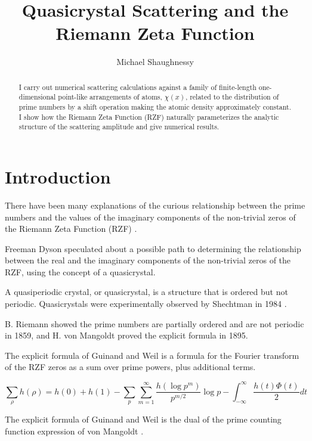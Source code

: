 \documentclass[11pt, oneside]{article}
\title{Quasicrystal Scattering and the Riemann Zeta Function}
\author{Michael Shaughnessy}
\begin{document}
\maketitle

\begin{abstract}
I carry out numerical scattering calculations against a family of finite-length one-dimensional point-like arrangements of atoms, $\chi(x)$, related to the distribution of prime numbers by a shift operation making the atomic density approximately constant. 
I show how the Riemann Zeta Function (RZF) naturally parameterizes the analytic structure of the scattering amplitude and give numerical results.
\end{abstract}

\section{Introduction}

There have been many explanations of the curious relationship between the prime numbers and the values of the imaginary components of the non-trivial zeros of the Riemann Zeta Function (RZF) \cite{Riemann1859, Selberg1956, Dyson2009, Zhang2014}.

Freeman Dyson \cite{Baez2013} speculated about a possible path to determining the relationship between the real and the imaginary components of the non-trivial zeros of the RZF, using the concept of a quasicrystal.

A quasiperiodic crystal, or quasicrystal, is a structure that is ordered but not periodic. Quasicrystals were experimentally observed by Shechtman in 1984 \cite{Shectman1984}. 

B. Riemann showed the prime numbers are partially ordered and are not periodic \cite{Riemann1859} in 1859, and H. von Mangoldt \cite{VonMangoldt1895} proved the explicit formula in 1895.

The explicit formula of Guinand and Weil \cite{Weil} is a formula for the Fourier transform of the RZF zeros as a sum over prime powers, plus additional terms.  

\begin{equation}
\sum_{\rho} h(\rho) = h(0) + h(1) - \sum_{p} \sum_{m=1}^{\infty} \frac{h(\log p^m)}{p^{m/2}} \log p - \int_{-\infty}^{\infty} \frac{h(t) \Phi(t)}{2} dt
\end{equation}

The explicit formula of Guinand and Weil is the dual of the prime counting function expression of von Mangoldt \cite{VonMangoldt1895}.
\end{document}
